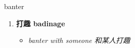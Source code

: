 
\begin{frame}
{\huge banter}
\begin{center}
\begin{enumerate}\Large
  \item \textbf{打趣 badinage}
  \begin{itemize}
    \item \em{\Large{banter with someone 和某人打趣}}
  \end{itemize}
\end{enumerate}
\end{center}
\end{frame}
